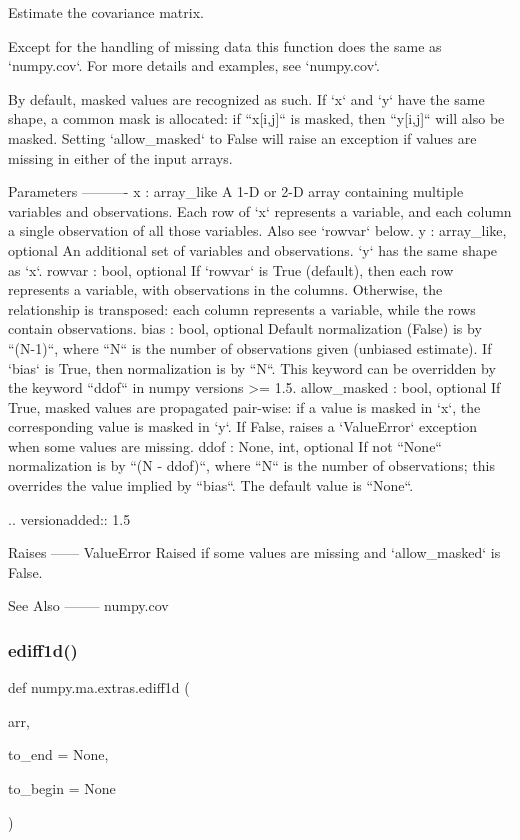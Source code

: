 \begin{DoxyVerb}Estimate the covariance matrix.

Except for the handling of missing data this function does the same as
`numpy.cov`. For more details and examples, see `numpy.cov`.

By default, masked values are recognized as such. If `x` and `y` have the
same shape, a common mask is allocated: if ``x[i,j]`` is masked, then
``y[i,j]`` will also be masked.
Setting `allow_masked` to False will raise an exception if values are
missing in either of the input arrays.

Parameters
----------
x : array_like
    A 1-D or 2-D array containing multiple variables and observations.
    Each row of `x` represents a variable, and each column a single
    observation of all those variables. Also see `rowvar` below.
y : array_like, optional
    An additional set of variables and observations. `y` has the same
    shape as `x`.
rowvar : bool, optional
    If `rowvar` is True (default), then each row represents a
    variable, with observations in the columns. Otherwise, the relationship
    is transposed: each column represents a variable, while the rows
    contain observations.
bias : bool, optional
    Default normalization (False) is by ``(N-1)``, where ``N`` is the
    number of observations given (unbiased estimate). If `bias` is True,
    then normalization is by ``N``. This keyword can be overridden by
    the keyword ``ddof`` in numpy versions >= 1.5.
allow_masked : bool, optional
    If True, masked values are propagated pair-wise: if a value is masked
    in `x`, the corresponding value is masked in `y`.
    If False, raises a `ValueError` exception when some values are missing.
ddof : {None, int}, optional
    If not ``None`` normalization is by ``(N - ddof)``, where ``N`` is
    the number of observations; this overrides the value implied by
    ``bias``. The default value is ``None``.

    .. versionadded:: 1.5

Raises
------
ValueError
    Raised if some values are missing and `allow_masked` is False.

See Also
--------
numpy.cov\end{DoxyVerb}
 \mbox{\label{namespacenumpy_1_1ma_1_1extras_a728a9d0dfe14a3ee87cbe74b73ac8983}} 
\subsubsection{\texorpdfstring{ediff1d()}{ediff1d()}}
{\footnotesize\ttfamily def numpy.\+ma.\+extras.\+ediff1d (\begin{DoxyParamCaption}\item[{}]{arr,  }\item[{}]{to\+\_\+end = {\ttfamily None},  }\item[{}]{to\+\_\+begin = {\ttfamily None} }\end{DoxyParamCaption})}





